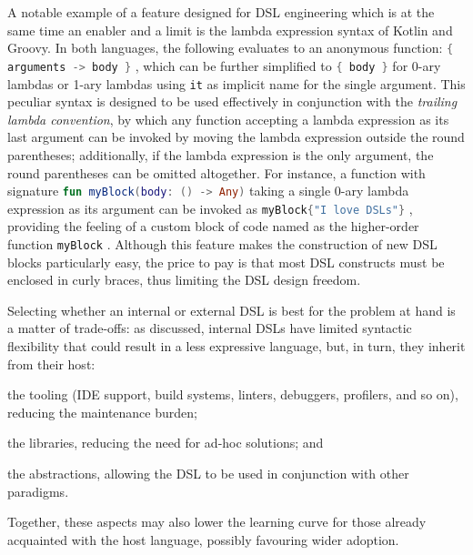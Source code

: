 A notable example of a feature designed for \ac{DSL} engineering which is at the same time an enabler and a limit
is the lambda expression syntax of Kotlin and Groovy.
%
In both languages, the following evaluates to an anonymous function:
\lstinline[language=Kotlin,breaklines=false]|{ arguments -> body }|%
,
which can be further simplified to
\lstinline[language=Kotlin,breaklines=false]|{ body }|
for 0-ary lambdas or 1-ary lambdas using
\lstinline[language=Kotlin,breaklines=false]|it|
as implicit name for the single argument.
%
This peculiar syntax is designed to be used effectively in conjunction with the \emph{trailing lambda convention},
by which any function accepting a lambda expression as its last argument can be invoked by moving the lambda expression outside the round parentheses;
additionally, if the lambda expression is the only argument, the round parentheses can be omitted altogether.
%
For instance, a function with signature
\lstinline[language=Kotlin,breaklines=false]|fun myBlock(body: () -> Any)|
taking a single 0-ary lambda expression as its argument can be invoked as
\lstinline[language=Kotlin,breaklines=false]|myBlock{"I love DSLs"}|%
,
providing the feeling of a custom block of code named as the higher-order function
\lstinline[language=Kotlin,breaklines=false]|myBlock|%
.
%
Although this feature makes the construction of new \ac{DSL} blocks particularly easy,
the price to pay is that most \ac{DSL} constructs must be enclosed in curly braces,
thus limiting the \ac{DSL} design freedom.

Selecting whether an internal or external \ac{DSL} is best for the problem at hand is a matter of trade-offs:
as discussed, internal \acp{DSL} have limited syntactic flexibility that could result in a less expressive language,
but, in turn, they inherit from their host:
\begin{inlinelist}
    \item the tooling
        (IDE support, build systems, linters, debuggers, profilers, and so on),
        reducing the maintenance burden;
    \item the libraries,
        reducing the need for ad-hoc solutions; and
    \item the abstractions,
        allowing the \ac{DSL} to be used in conjunction with other paradigms.
\end{inlinelist}
%
Together, these aspects may also lower the learning curve for those already acquainted with the host language,
possibly favouring wider adoption.

